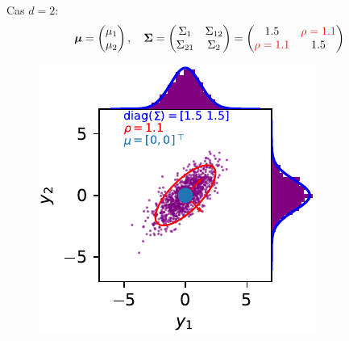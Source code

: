 \documentclass[xcolor=svgnames, t]{beamer}
\newcommand{\vectorx}[1]{\boldsymbol{\MakeLowercase{\mathbf{#1}}}}
\newcommand{\matrixx}[1]{\boldsymbol{\MakeUppercase{#1}}}
\begin{document}
\begin{frame}
  Cas $d=2$:
  \begin{equation*}
    \vectorx{\mu}
    =
    \begin{pmatrix}
      \mu_1 \\
      \mu_2
    \end{pmatrix},
    \quad
    \matrixx{\Sigma}
    =
      \begin{pmatrix}
        \Sigma_{1} & \Sigma_{12} \\
        \Sigma_{21} & \Sigma_{2}
      \end{pmatrix}
    =
      \begin{pmatrix}
        1.5 & \color{red}\rho = 1.1 \\
        \color{red}\rho = 1.1 & 1.5
      \end{pmatrix}
  \end{equation*}
% 
  \begin{figure}
    \includegraphics{gaussian_2d_rho_high.pdf}
  \end{figure}
\end{frame}
\end{document}
